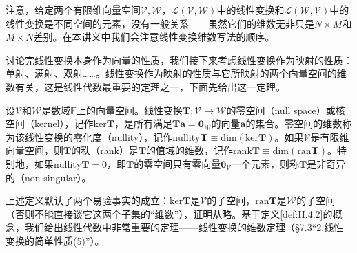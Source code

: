 \documentclass[main.tex]{subfiles}
\begin{document}
注意，给定两个有限维向量空间$\mathcal{V},\mathcal{W}$，$\mathcal{L}\left(\mathcal{V},\mathcal{W}\right)$中的线性变换和$\mathcal{L}\left(\mathcal{W},\mathcal{V}\right)$中的线性变换是不同空间的元素，没有一般关系——虽然它们的维数无非只是$N\times M$和$M\times N$差别。在本讲义中我们会注意线性变换维数写法的顺序。

讨论完线性变换本身作为向量的性质，我们接下来考虑线性变换作为映射的性质：单射、满射、双射……。线性变换作为映射的性质与它所映射的两个向量空间的维数有关，这是线性代数最重要的定理之一，下面先给出这一定理。

\begin{definition}\label{def:II.4.2}
设$\mathcal{V}$和$\mathcal{W}$是数域$\mathbb{F}$上的向量空间。线性变换$\mathbf{T}:\mathcal{V}\rightarrow\mathcal{W}$的零空间（null space）或核空间（kernel），记作$\mathrm{ker}\mathbf{T}$，是所有满足$\mathbf{Ta}=\mathbf{0}_\mathcal{W}$的向量$\mathbf{a}$的集合。零空间的维数称为该线性变换的零化度（nullity），记作$\mathrm{nullity}\mathbf{T}\equiv\mathrm{dim}\left(\mathrm{ker}\mathbf{T}\right)$。如果$\mathcal{V}$是有限维向量空间，则$\mathbf{T}$的秩（rank）是$\mathbf{T}$的值域的维数，记作$\mathrm{rank}\mathbf{T}\equiv\mathrm{dim}\left(\mathrm{ran}\mathbf{T}\right)$。特别地，如果$\mathrm{nullity}\mathbf{T}=0$，即$\mathbf{T}$的零空间只有零向量$\mathbf{0}_\mathcal{V}$一个元素，则称$\mathbf{T}$是非奇异的（non-singular）。
\end{definition}

上述定义默认了两个易验事实的成立：$\mathrm{ker}\mathbf{T}$是$\mathcal{V}$的子空间，$\mathrm{ran}\mathbf{T}$是$\mathcal{W}$的子空间（否则不能直接谈它这两个子集的“维数”），证明从略\cite[\S7.3“2.线性变换的简单性质(4)”p.~177]{周胜林2012线性代数}。基于定义\ref{def:II.4.2}的概念，我们给出线性代数中非常重要的定理——线性变换的维数定理（\S7.3“2.线性变换的简单性质(5)”\cite[p.~178]{周胜林2012线性代数}）。
\end{document}
